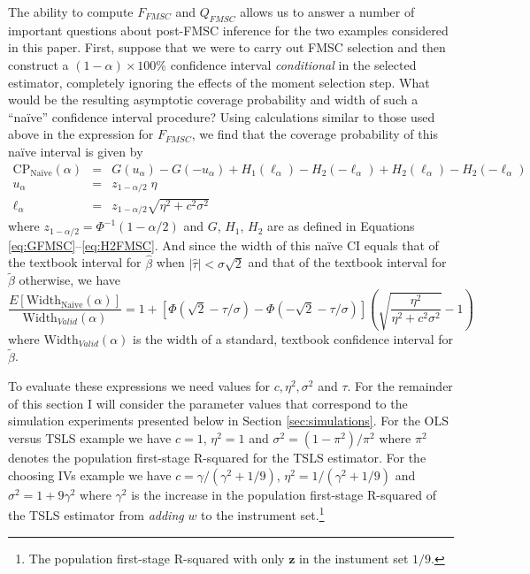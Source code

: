 The ability to compute $F_{FMSC}$ and $Q_{FMSC}$ allows us to answer a number of important questions about post-FMSC inference for the two examples considered in this paper.
First, suppose that we were to carry out FMSC selection and then construct a $(1 - \alpha) \times 100\%$ confidence interval \emph{conditional} in the selected estimator, completely ignoring the effects of the moment selection step.
What would be the resulting asymptotic coverage probability and width of such a ``na\"{i}ve'' confidence interval procedure?
Using calculations similar to those used above in the expression for $F_{FMSC}$, we find that the coverage probability of this na\"{i}ve interval is given by
\begin{eqnarray*}
  \mbox{CP}_{\mbox{Na\"{i}ve}}(\alpha) &=& G(u_\alpha) - G(-u_\alpha) +  H_1(\ell_\alpha) - H_2(-\ell_\alpha) +  H_2(\ell_\alpha) - H_2(-\ell_\alpha) \\
  u_\alpha &=& z_{1-\alpha/2}\; \eta\\
  \ell_{\alpha} &=& z_{1-\alpha/2} \sqrt{\eta^2 + c^2\sigma^2}
\end{eqnarray*}
where $z_{1-\alpha/2} = \Phi^{-1}(1 -\alpha/2)$ and $G$, $H_1$, $H_2$ are as defined in Equations \ref{eq:GFMSC}--\ref{eq:H2FMSC}.
And since the width of this na\"{i}ve CI equals that of the textbook interval for $\widehat{\beta}$ when $|\widehat{\tau}|<\sigma\sqrt{2}$ and that of the textbook interval for $\widetilde{\beta}$ otherwise, we have
\begin{equation*}
  \frac{E\left[ \mbox{Width}_{\mbox{Na\"{i}ve}}(\alpha) \right]}{\mbox{Width}_{Valid}(\alpha)} = 1 + \left[ \Phi( \sqrt{2} - \tau/\sigma) -  \Phi( -\sqrt{2} - \tau/\sigma )\right]\left( \sqrt{\frac{\eta^2}{\eta^2 + c^2 \sigma^2}} - 1 \right)
\end{equation*}
where $\mbox{Width}_{Valid}(\alpha)$ is the width of a standard, textbook confidence interval for $\widetilde{\beta}$.

To evaluate these expressions we need values for $c, \eta^2, \sigma^2$ and $\tau$.
For the remainder of this section I will consider the parameter values that correspond to the simulation experiments presented below in Section \ref{sec:simulations}.
For the OLS versus TSLS example we have $c=1$, $\eta^2=1$ and $\sigma^2 = (1-\pi^2)/\pi^2$ where $\pi^2$ denotes the population first-stage R-squared for the TSLS estimator. 
For the choosing IVs example we have $c =\gamma/(\gamma^2 +1/9)$, $\eta^2 = 1/(\gamma^2 + 1/9)$ and $\sigma^2 = 1 + 9\gamma^2$ where $\gamma^2$ is the increase in the population first-stage R-squared of the TSLS estimator from \emph{adding} $w$ to the instrument set.\footnote{The population first-stage R-squared with only $\mathbf{z}$ in the instument set $1/9$.}

